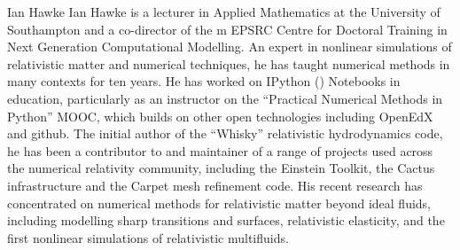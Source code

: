 \begin{participant}[PM=2,type=PI,gender=male]{Ian Hawke}
%
Ian Hawke is a lecturer in Applied Mathematics at the University of
Southampton and a co-director of the m EPSRC Centre for Doctoral
Training in Next Generation Computational Modelling. An expert in
nonlinear simulations of relativistic matter and numerical techniques,
he has taught numerical methods in many contexts for ten years. He has
worked on IPython (\Jupyter{}) Notebooks in education, particularly as an
instructor on the ``Practical Numerical Methods in Python'' MOOC,
which builds on other open technologies including OpenEdX and github. The
initial author of the ``Whisky'' relativistic hydrodynamics code, he has
been a contributor to and maintainer of a range of projects used
across the numerical relativity community, including the Einstein
Toolkit, the Cactus infrastructure and the Carpet mesh refinement
code. His recent research has concentrated on numerical methods for
relativistic matter beyond ideal fluids, including modelling sharp
transitions and surfaces, relativistic elasticity, and the first
nonlinear simulations of relativistic multifluids.
%
\end{participant}


